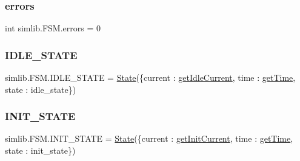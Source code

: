 \mbox{\label{namespacesimlib_1_1_f_s_m_aff891129d4aee54ac02d325c3ca3bc1f}} 
\subsubsection{\texorpdfstring{errors}{errors}}
{\footnotesize\ttfamily int simlib.\+F\+S\+M.\+errors = 0}

\mbox{\label{namespacesimlib_1_1_f_s_m_ad20271829f08fa7dbdd0c9648f2987e4}} 
\subsubsection{\texorpdfstring{I\+D\+L\+E\+\_\+\+S\+T\+A\+TE}{IDLE\_STATE}}
{\footnotesize\ttfamily simlib.\+F\+S\+M.\+I\+D\+L\+E\+\_\+\+S\+T\+A\+TE = \mbox{\hyperlink{classsimlib_1_1_f_s_m_1_1_state}{State}}(\{\textquotesingle{}current\textquotesingle{} \+: \mbox{\hyperlink{namespacesimlib_1_1_f_s_m_a794c6f3e74c219f76fce65bc83c37cf2}{get\+Idle\+Current}}, \textquotesingle{}time\textquotesingle{} \+: \mbox{\hyperlink{namespacesimlib_1_1_f_s_m_a11348c0ee93cab46de076fcf8ec8395f}{get\+Time}}, \textquotesingle{}state\textquotesingle{} \+: \textquotesingle{}idle\+\_\+state\textquotesingle{}\})}

\mbox{\label{namespacesimlib_1_1_f_s_m_a898455364bde4844e371110a5ca96f9e}} 
\subsubsection{\texorpdfstring{I\+N\+I\+T\+\_\+\+S\+T\+A\+TE}{INIT\_STATE}}
{\footnotesize\ttfamily simlib.\+F\+S\+M.\+I\+N\+I\+T\+\_\+\+S\+T\+A\+TE = \mbox{\hyperlink{classsimlib_1_1_f_s_m_1_1_state}{State}}(\{\textquotesingle{}current\textquotesingle{} \+: \mbox{\hyperlink{namespacesimlib_1_1_f_s_m_a585836de7988c4c8a00953ff69743ebb}{get\+Init\+Current}}, \textquotesingle{}time\textquotesingle{} \+: \mbox{\hyperlink{namespacesimlib_1_1_f_s_m_a11348c0ee93cab46de076fcf8ec8395f}{get\+Time}}, \textquotesingle{}state\textquotesingle{} \+: \textquotesingle{}init\+\_\+state\textquotesingle{}\})}

